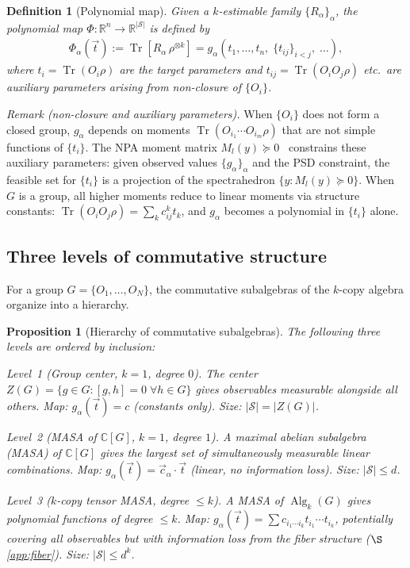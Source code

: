 \documentclass[aps,%
twocolumn,%
floatfix,%
pra,%
amsfonts,%
groupedaddress,%
superscriptaddress]{revtex4-2}%
\newtheorem{proposition}[theorem]{Proposition}
\newtheorem{definition}{Definition}[section]
\DeclareMathOperator{\tr}{Tr}
\newcommand{\ox}{\otimes}
\newcommand{\1}{\mathbbm{1}}
\newcommand*{\cS}{\mathcal{S}}
\DeclareMathOperator{\Alg}{Alg}
\begin{document}
\begin{definition}[Polynomial map]\label{def:poly-map}
Given a $k$-estimable family $\{R_\alpha\}_\alpha$, the \emph{polynomial map} $\Phi: \mathbb{R}^n \to \mathbb{R}^{|\cS|}$ is defined by
\begin{align}
\Phi_\alpha(\vec{t}) := \tr[R_\alpha\,\rho^{\ox k}] = g_\alpha(t_1,\ldots,t_n,\; \{t_{ij}\}_{i<j},\; \ldots),
\end{align}
where $t_i = \tr(O_i\rho)$ are the target parameters and $t_{ij} = \tr(O_iO_j\rho)$ etc.\ are auxiliary parameters arising from non-closure of $\{O_i\}$.
\end{definition}

\emph{Remark (non-closure and auxiliary parameters).}
When $\{O_i\}$ does not form a closed group, $g_\alpha$ depends on moments $\tr(O_{i_1}\cdots O_{i_m}\rho)$ that are not simple functions of $\{t_i\}$. The NPA moment matrix $M_l(y) \succeq 0$~\cite{navascues2008convergent,pironio2010convergent} constrains these auxiliary parameters: given observed values $\{g_\alpha\}_\alpha$ and the PSD constraint, the feasible set for $\{t_i\}$ is a projection of the spectrahedron $\{y : M_l(y) \succeq 0\}$. When $G$ is a group, all higher moments reduce to linear moments via structure constants: $\tr(O_iO_j\rho) = \sum_k c_{ij}^k t_k$, and $g_\alpha$ becomes a polynomial in $\{t_i\}$ alone.


\subsection{Three levels of commutative structure}\label{app:three_levels}

For a group $G = \{O_1, \ldots, O_N\}$, the commutative subalgebras of the $k$-copy algebra organize into a hierarchy.

\begin{proposition}[Hierarchy of commutative subalgebras]\label{prop:three-levels}
The following three levels are ordered by inclusion:

\emph{Level~1 (Group center, $k=1$, degree $0$).}
The center $Z(G) = \{g \in G : [g,h]=0\;\forall h\in G\}$ gives observables measurable alongside all others. Map: $g_\alpha(\vec{t}) = c$ (constants only). Size: $|\cS| = |Z(G)|$.

\emph{Level~2 (MASA of $\mathbb{C}[G]$, $k=1$, degree $1$).}
A maximal abelian subalgebra (MASA) of $\mathbb{C}[G]$ gives the largest set of simultaneously measurable linear combinations. Map: $g_\alpha(\vec{t}) = \vec{c}_\alpha \cdot \vec{t}$ (linear, no information loss). Size: $|\cS| \leq d$.

\emph{Level~3 ($k$-copy tensor MASA, degree $\leq k$).}
A MASA of $\Alg_k(G)$ gives polynomial functions of degree $\leq k$. Map: $g_\alpha(\vec{t}) = \sum c_{i_1\cdots i_k} t_{i_1}\cdots t_{i_k}$, potentially covering all observables but with information loss from the fiber structure ($\S$\ref{app:fiber}). Size: $|\cS| \leq d^k$.
\end{proposition}
\end{document}
